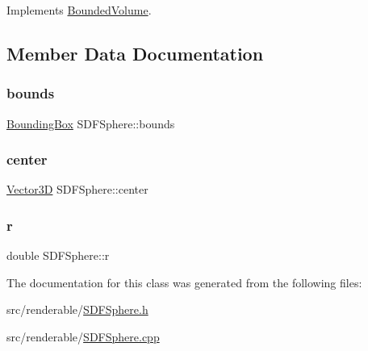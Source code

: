 Implements \mbox{\hyperlink{classBoundedVolume_a281168c4d827c38b46e639f6e4991a9e}{Bounded\+Volume}}.



\subsection{Member Data Documentation}
\mbox{\label{classSDFSphere_a7df90cc239506488f1bb76cd5f78cdb3}} 
\subsubsection{\texorpdfstring{bounds}{bounds}}
{\footnotesize\ttfamily \mbox{\hyperlink{classBoundingBox}{Bounding\+Box}} S\+D\+F\+Sphere\+::bounds\hspace{0.3cm}{\ttfamily [private]}}

\mbox{\label{classSDFSphere_ae84a69978c77f2220b7a5dde3694477a}} 
\subsubsection{\texorpdfstring{center}{center}}
{\footnotesize\ttfamily \mbox{\hyperlink{classVector3D}{Vector3D}} S\+D\+F\+Sphere\+::center\hspace{0.3cm}{\ttfamily [private]}}

\mbox{\label{classSDFSphere_a907d3a0d7b563b73e5ebc0f3e04d948e}} 
\subsubsection{\texorpdfstring{r}{r}}
{\footnotesize\ttfamily double S\+D\+F\+Sphere\+::r\hspace{0.3cm}{\ttfamily [private]}}



The documentation for this class was generated from the following files\+:\begin{DoxyCompactItemize}
\item 
src/renderable/\mbox{\hyperlink{SDFSphere_8h}{S\+D\+F\+Sphere.\+h}}\item 
src/renderable/\mbox{\hyperlink{SDFSphere_8cpp}{S\+D\+F\+Sphere.\+cpp}}\end{DoxyCompactItemize}
